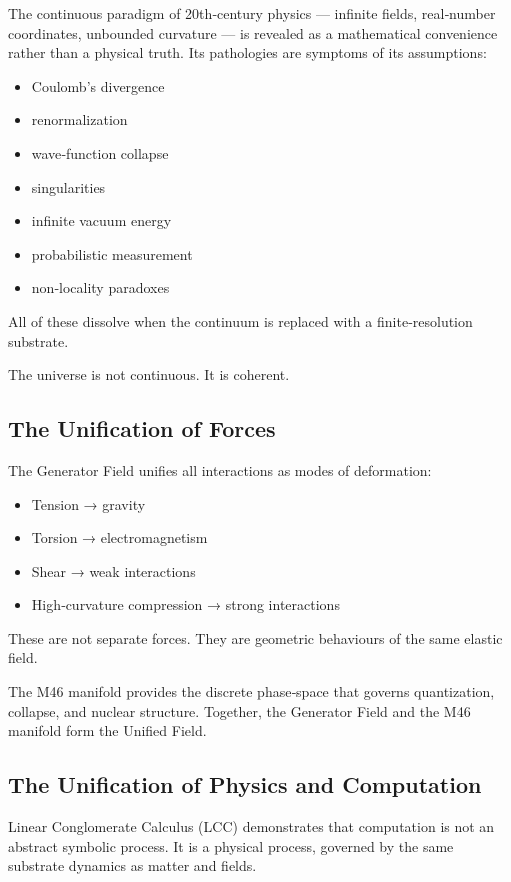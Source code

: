 \documentclass[reprint,amsmath,amssymb,aps,prl,floatfix]{revtex4-2}
\begin{document}
\begin{itemize}
The continuous paradigm of 20th‑century physics — infinite fields, real‑number coordinates, unbounded curvature — is revealed as a mathematical convenience rather than a physical truth. Its pathologies are symptoms of its assumptions:
\begin{itemize}
\item Coulomb’s divergence  
\item renormalization  
\item wave‑function collapse  
\item singularities  
\item infinite vacuum energy  
\item probabilistic measurement  
\item non‑locality paradoxes  
\end{itemize}
\medskip

All of these dissolve when the continuum is replaced with a finite‑resolution substrate.
\medskip

The universe is not continuous.  
It is coherent.

\subsection{The Unification of Forces}

The Generator Field unifies all interactions as modes of deformation:
\begin{itemize}
\item Tension → gravity  
\item Torsion → electromagnetism  
\item Shear → weak interactions  
\item High‑curvature compression → strong interactions  
\end{itemize}
\medskip

These are not separate forces.  
They are geometric behaviours of the same elastic field.
\medskip

The M46 manifold provides the discrete phase‑space that governs quantization, collapse, and nuclear structure. Together, the Generator Field and the M46 manifold form the Unified Field.

\subsection{The Unification of Physics and Computation}

Linear Conglomerate Calculus (LCC) demonstrates that computation is not an abstract symbolic process. It is a physical process, governed by the same substrate dynamics as matter and fields.


\end{itemize}
\end{document}

